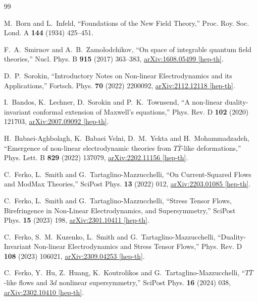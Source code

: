 \documentclass[a4paper,11pt]{ltjsreport}
\begin{document}
\begin{thebibliography}{99}

M.~Born and L.~Infeld,
``Foundations of the New Field Theory,''
Proc. Roy. Soc. Lond. A \textbf{144} (1934) 425--451.

F.~A.~Smirnov and A.~B.~Zamolodchikov,
``On space of integrable quantum field theories,''
Nucl. Phys. B \textbf{915} (2017) 363--383,
\href{https://arxiv.org/abs/1608.05499}{arXiv:1608.05499 [hep-th]}.

D.~P.~Sorokin,
``Introductory Notes on Non-linear Electrodynamics and its Applications,''
Fortsch. Phys. \textbf{70} (2022) 2200092,
\href{https://arxiv.org/abs/2112.12118}{arXiv:2112.12118 [hep-th]}.

I.~Bandos, K.~Lechner, D.~Sorokin and P.~K.~Townsend,
``A non-linear duality-invariant conformal extension of Maxwell's equations,''
Phys. Rev. D \textbf{102} (2020) 121703,
\href{https://arxiv.org/abs/2007.09092}{arXiv:2007.09092 [hep-th]}.

H.~Babaei-Aghbolagh, K.~Babaei Velni, D.~M.~Yekta and H.~Mohammadzadeh,
``Emergence of non-linear electrodynamic theories from $T\overline T$-like deformations,''
Phys. Lett. B \textbf{829} (2022) 137079,
\href{https://arxiv.org/abs/2202.11156}{arXiv:2202.11156 [hep-th]}.

C.~Ferko, L.~Smith and G.~Tartaglino-Mazzucchelli,
``On Current-Squared Flows and ModMax Theories,''
SciPost Phys. \textbf{13} (2022) 012,
\href{https://arxiv.org/abs/2203.01085}{arXiv:2203.01085 [hep-th]}.

C.~Ferko, L.~Smith and G.~Tartaglino-Mazzucchelli,
``Stress Tensor Flows, Birefringence in Non-Linear Electrodynamics, and Supersymmetry,''
SciPost Phys. \textbf{15} (2023) 198,
\href{https://arxiv.org/abs/2301.10411}{arXiv:2301.10411 [hep-th]}.

C.~Ferko, S.~M.~Kuzenko, L.~Smith and G.~Tartaglino-Mazzucchelli,
``Duality-Invariant Non-linear Electrodynamics and Stress Tensor Flows,''
Phys. Rev. D \textbf{108} (2023) 106021,
\href{https://arxiv.org/abs/2309.04253}{arXiv:2309.04253 [hep-th]}.

C.~Ferko, Y.~Hu, Z.~Huang, K.~Koutrolikos and G.~Tartaglino-Mazzucchelli,
``$T\overline T$-like flows and $3d$ nonlinear supersymmetry,''
SciPost Phys. \textbf{16} (2024) 038,
\href{https://arxiv.org/abs/2302.10410}{arXiv:2302.10410 [hep-th]}.


\end{thebibliography}
\end{document}
